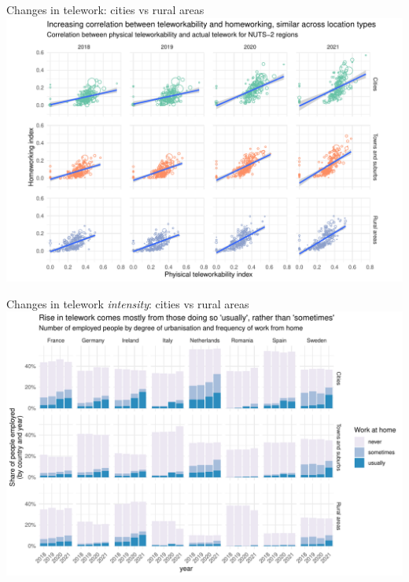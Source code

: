 \documentclass[10pt,handout]{beamer}
\begin{document}
\begin{frame}{Changes in telework: cities vs rural areas}
\pause
\centering
\includegraphics[width=\textwidth,height=0.9\textheight,keepaspectratio]{Correlation_teleworkability_telework_degurba.pdf}
\end{frame}


\begin{frame}{Changes in telework \emph{intensity}: cities vs rural areas}
\pause
\centering
\includegraphics[width=\textwidth,height=0.9\textheight,keepaspectratio]{Telework_intensity_degurba_selected.pdf}
\end{frame}
\end{document}
